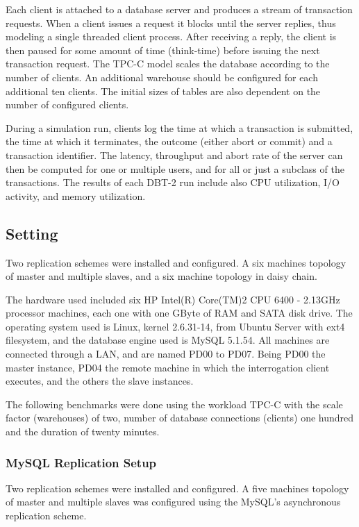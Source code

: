 Each client is attached to a database server and produces a stream of transaction requests. When a client issues a request it blocks until the server replies, thus modeling a single threaded client process. After receiving a reply, the client is then paused for some amount of time (think-time) before issuing the next transaction request. The TPC-C model scales the database according to the number of clients. An additional warehouse should be configured for each additional ten clients. The initial sizes of tables are also dependent on the number of configured clients.

During a simulation run, clients log the time at which a transaction is submitted, the time at which it terminates, the outcome (either abort or commit) and a transaction identifier. The latency, throughput and abort rate of the server can then be computed for one or multiple users, and for all or just a subclass of the transactions. The results of each DBT-2 run include also CPU utilization, I/O activity, and memory utilization.


\subsection{Setting}

Two replication schemes were installed and configured. A six machines topology of master and multiple slaves, and a six machine topology in daisy chain. 

The hardware used included six HP Intel(R) Core(TM)2 CPU 6400 - 2.13GHz processor machines, each one with one GByte of RAM and SATA disk drive. The operating system used is Linux, kernel 2.6.31-14, from Ubuntu Server with ext4 filesystem, and the database engine used is MySQL 5.1.54. All machines are connected through a LAN, and are named PD00 to PD07. Being PD00 the master instance, PD04 the remote machine in which the interrogation client executes, and the others the slave instances.

The following benchmarks were done using the workload TPC-C with the scale factor (warehouses) of two, number of database connections (clients) one hundred and the duration of twenty minutes.

\subsubsection{MySQL Replication Setup}

Two replication schemes were installed and configured. A five machines topology of master and multiple slaves was configured using the MySQL's asynchronous replication scheme. 

